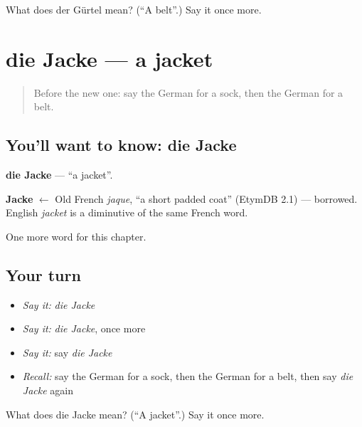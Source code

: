 \begin{tcolorbox}[breakable,colback=teal!4,colframe=teal!35!black,title={Before you move on}]
What does der Gürtel mean? (\textquotedblleft{}A belt\textquotedblright{}.) Say it once more.
\end{tcolorbox}
\section[die Jacke]{die Jacke — a jacket}

\label{lesson:GE-C100-jacke}



\begin{quote}
Before the new one: say the German for a sock, then the German for a belt.
\end{quote}

\subsection*{You'll want to know: die Jacke}
\textbf{die Jacke} — \textquotedblleft{}a jacket\textquotedblright{}.

\begin{cousinweb}
\textbf{Jacke} $\leftarrow$ Old French \emph{jaque}, \textquotedblleft{}a short padded coat\textquotedblright{} (EtymDB 2.1) — borrowed. English \emph{jacket} is a diminutive of the same French word.
\end{cousinweb}

\begin{grammarlens}[title={What you've built}]
One more word for this chapter.
\end{grammarlens}

\subsection*{Your turn}
\begin{itemize}
\raggedright
  \item \emph{Say it:} \emph{die Jacke}
  \item \emph{Say it:} \emph{die Jacke}, once more
  \item \emph{Say it:} say \emph{die Jacke}
  \item \emph{Recall:} say the German for a sock, then the German for a belt, then say \emph{die Jacke} again
\end{itemize}

\begin{tcolorbox}[breakable,colback=teal!4,colframe=teal!35!black,title={Before you move on}]
What does die Jacke mean? (\textquotedblleft{}A jacket\textquotedblright{}.) Say it once more.
\end{tcolorbox}
